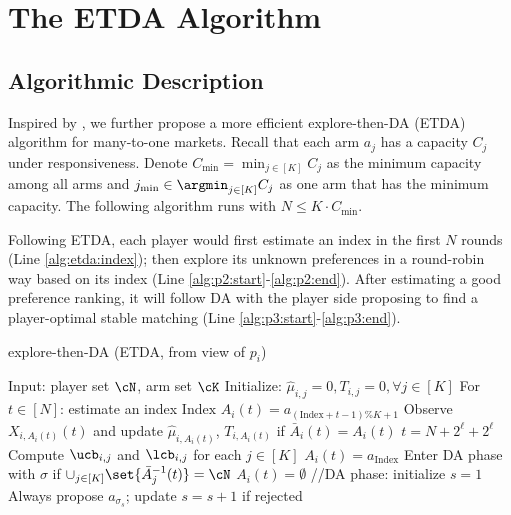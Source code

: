 

\section{The ETDA Algorithm}
\label{sec:etda:appendix}

\subsection{Algorithmic Description}




Inspired by \citet{kong2023player}, we further propose a more efficient explore-then-DA (ETDA) algorithm for many-to-one markets. 
Recall that each arm $a_j$ has a capacity $C_j$ under responsiveness. Denote $C_{\min} = \min_{j \in [K]} C_j$ as the minimum capacity among all arms and $j_{\min} \in \argmin_{j \in [K]} C_j$ as one arm that has the minimum capacity. 
The following algorithm runs with $N \le K\cdot C_{\min}$. 



Following ETDA, each player would first estimate an index in the first $N$ rounds (Line \ref{alg:etda:index}); then explore its unknown preferences in a round-robin way based on its index (Line \ref{alg:p2:start}-\ref{alg:p2:end}). After estimating a good preference ranking, it will follow DA with the player side proposing to find a player-optimal stable matching (Line \ref{alg:p3:start}-\ref{alg:p3:end}). 


\begin{algorithm}[thb!]
    \caption{explore-then-DA (ETDA, from view of $p_i$)}\label{alg:etda}
    \begin{algorithmic}[1]
    \STATE Input: player set $\cN$, arm set $\cK$ \label{alg:input}
    \STATE Initialize: $\hat{\mu}_{i,j}=0, T_{i,j}=0, \forall j\in[K]$
    \STATE For $t\in[N]$: estimate an index $\mathrm{Index}$ \label{alg:etda:index}
    \label{alg:p2:start}
         \label{alg:p2:learn:start} 
            \STATE  $A_i(t)=a_{(\mathrm{Index}+t-1)\%K+1}$ \label{alg:p2:learn:select}
            \STATE Observe $X_{i,A_i(t)}(t)$ and update $\hat{\mu}_{i,A_i(t)}$, $T_{i,A_i(t)}$ if $\bar{A}_i(t) = A_i(t) $ \label{alg:p2:learn:update}
        \ENDFOR\label{alg:p2:learn:end}
        \STATE $t = N+2^{\ell}+2^{\ell}$\label{alg:monitor:round}
        \STATE Compute $\ucb_{i,j}$ and $\lcb_{i,j}$ for each $j\in[K]$ \label{alg:p2:computeUCBLCB}
         \label{alg:p2:rank:start}
        \STATE $A_i(t) = a_{\mathrm{Index}}$
        \STATE Enter DA phase with $\sigma$ if $\cup_{j\in[K]} \set{\bar{A}^{-1}_{j}(t)}= \cN$ \label{alg:p2:enterP3}
        \ELSE 
        \STATE $A_i(t) = \emptyset$
        \ENDIF \label{alg:p2:rank:end}
    \ENDFOR\label{alg:p2:end} 
    \STATE //DA phase: initialize $s=1$ \label{alg:p3:start}
    \STATE Always propose $a_{\sigma_{s}}$; update $s=s+1$ if rejected \label{alg:p3:end}
    \end{algorithmic}
\end{algorithm}

